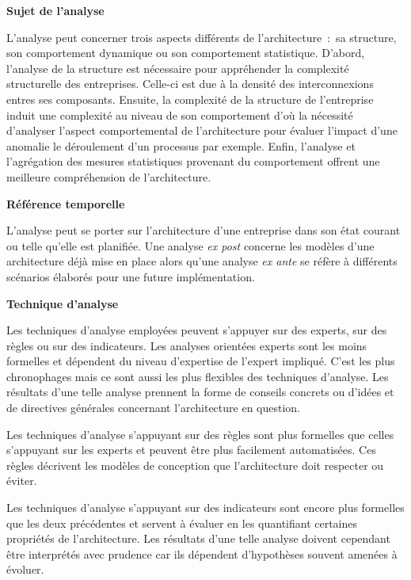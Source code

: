 	\begin{description}
	\item \textbf{Sujet de l'analyse} 

L'analyse peut concerner trois aspects différents de l'architecture~:~sa 
structure, son comportement dynamique ou son comportement statistique. D'abord, 
l'analyse de la structure est nécessaire pour appréhender la complexité 
structurelle des entreprises. Celle-ci est due à la densité des interconnexions 
entres ses composants. Ensuite, la complexité de la structure de l'entreprise 
induit une complexité au niveau de son comportement d'où la nécessité d'analyser 
l'aspect comportemental de l'architecture pour évaluer l'impact d'une anomalie 
le déroulement d'un processus par exemple. Enfin, l'analyse et l'agrégation des 
mesures statistiques provenant du comportement offrent une meilleure 
compréhension de l'architecture.

	\item \textbf{Référence temporelle}

L'analyse peut se porter sur l'architecture d'une entreprise dans son état 
courant ou telle qu'elle est planifiée. Une analyse \textit{ex post} concerne 
les modèles d'une architecture déjà mise en place alors qu'une analyse 
\textit{ex ante} se réfère à différents scénarios élaborés pour une future 
implémentation.

	\item \textbf{Technique d'analyse}

Les techniques d'analyse employées peuvent s'appuyer sur des experts, sur des 
règles ou sur des indicateurs. Les analyses orientées experts sont les moins 
formelles et dépendent du niveau d'expertise de l'expert impliqué. C'est les 
plus chronophages mais ce sont aussi les plus flexibles des techniques 
d'analyse. Les résultats d'une telle analyse prennent la forme de conseils 
concrets ou d'idées et de directives générales concernant l'architecture en 
question.

Les techniques d'analyse s'appuyant sur des règles sont plus formelles que 
celles s'appuyant sur les experts et peuvent être plus facilement automatisées. 
Ces règles décrivent les modèles de conception que l'architecture doit respecter 
ou éviter. 

Les techniques d'analyse s'appuyant sur des indicateurs sont encore plus 
formelles que les deux précédentes et servent à évaluer en les quantifiant 
certaines propriétés de l'architecture. Les résultats d'une telle analyse 
doivent cependant être interprétés avec prudence car ils dépendent d'hypothèses 
souvent amenées à évoluer.


\end{description}
